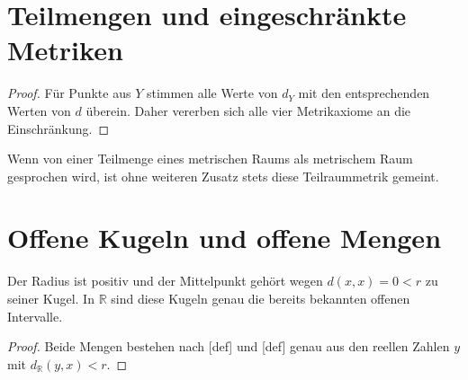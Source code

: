 \documentclass[main.tex]{subfiles}
\begin{document}
\section{Teilmengen und eingeschränkte Metriken}


\begin{proof}
Für Punkte aus \(Y\) stimmen alle Werte von \(d_Y\) mit den entsprechenden
Werten von \(d\) überein. Daher vererben sich alle vier Metrikaxiome an die
Einschränkung.
\end{proof}

Wenn von einer Teilmenge eines metrischen Raums als metrischem Raum gesprochen
wird, ist ohne weiteren Zusatz stets diese Teilraummetrik gemeint.

\section{Offene Kugeln und offene Mengen}


Der Radius ist positiv und der Mittelpunkt gehört wegen
\(d(x,x)=0<r\) zu seiner Kugel. In \(\mathbb R\) sind diese Kugeln genau die
bereits bekannten offenen Intervalle.

\begin{proof}
Beide Mengen bestehen nach
[def] und
[def] genau aus den reellen Zahlen
\(y\) mit \(d_{\mathbb R}(y,x)<r\).
\end{proof}
\end{document}
